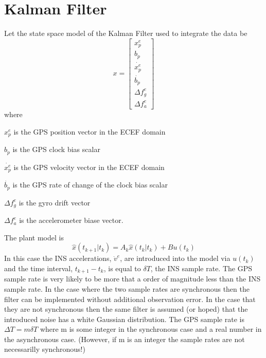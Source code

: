 \documentclass[a4paper]{report}
\numberwithin{equation}{chapter}
\begin{document}
\section[Kalman Filter]{Kalman Filter}

Let the state space model of the Kalman Filter used to integrate the data be
\begin{equation}
x =
\begin{bmatrix}
x^e_p\\
b_p\\
\dot{x^e_p}\\
\dot{b_p}\\
\Delta f^e_g\\
\Delta f^e_a
\end{bmatrix}
\label{StateSpaceModel}
\end{equation}
where

$x^e_p$ is the GPS position vector in the ECEF domain

$b_p$ is the GPS clock bias scalar

$\dot{x^e_p}$ is the GPS velocity vector in the ECEF domain

$\dot{b_p}$ is the GPS rate of change of the clock bias scalar

$\Delta f^e_g$ is the gyro drift vector

$\Delta f^e_a$ is the accelerometer biase vector.

\bigskip

The plant model is
\begin{equation}
\hat{x} \left( t_{k + 1} | t_k \right) = A_k \hat{x} \left( t_k | t_k \right) + B u \left( t_k \right)
\label{eqn:PlantModel}
\end{equation}
In this case the INS accelerations, $\dot{v}^e$, are introduced into the model via $u \left( t_k \right)$ and the time interval, $t_{k + 1} - t_k$, is equal to $\delta T$, the INS sample rate. The GPS sample rate is very likely to be more that a order of magnitude less than the INS sample rate. In the case where the two sample rates are synchronous then the filter can be implemented without additional observation error. In the case that they are not synchronous then the same filter is assumed (or hoped) that the introduced noise has a white Gaussian distribution. The GPS sample rate is $\Delta T = m \delta T$ where m is some integer in the synchronous case and a real number in the asynchronous case. (However, if m is an integer the sample rates are not necessarilly synchronous!)

\bigskip
\end{document}
